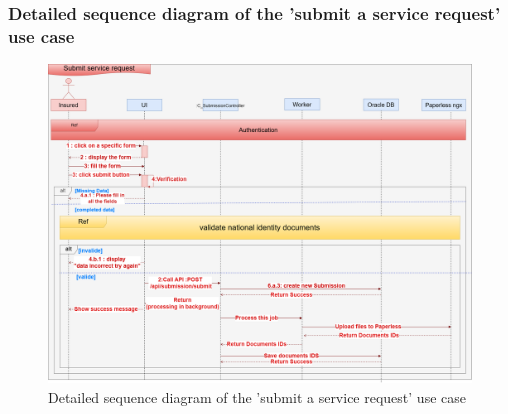 \subsubsection{Detailed sequence diagram of the 'submit a service request' use case}
\begin{figure}[h!]
    \centering
    \includegraphics[width=1\textwidth]{figures/det Submits a service request.png}
    \caption{Detailed sequence diagram of the 'submit a service request' use case}
    \label{fig:image4}
\end{figure}
\clearpage

